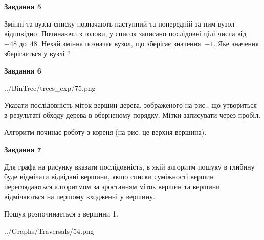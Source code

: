 \documentclass[12pt, ukrainian]{article}
\begin{document}
{\begin {large}
{\begin {center}\textbf{Завдання 5}\end {center}}\par
Змінні  та  вузла списку позначають наступний та попередній за ним вузол відповідно. Починаючи з голови, у список записано послідовні цілі числа від~$-48$ до~$48$. Нехай змінна  позначає вузол, що зберігає значення~$-1$.
Яке значення зберігається у вузлі  ?\par
\newpage

{\begin {center}\textbf{Завдання 6}\end {center}}\par

\begin{center}
	{../BinTree/trees_exp/75.png}
\end{center}
Указати послідовність міток вершин дерева, зображеного на рис., що утвориться в результаті обходу дерева в оберненому порядку. Мітки записувати через пробіл.\par Алгоритм починає роботу з кореня (на рис. це верхня вершина).\par
\newpage

{\begin {center}\textbf{Завдання 7}\end {center}}\par
Для графа на рисунку вказати послідовність, в якій алгоритм пошуку в глибину буде відмічати відвідані вершини, якщо списки суміжності вершин переглядаються алгоритмом за зростанням міток вершин та вершини відмічаються на першому вход\-женні у вершину.\par
Пошук розпочинається з вершини 1.\par

\begin{center}
	{../Graphs/Traversals/54.png}
\end{center}\par
\newpage


\end{large}}
\end{document}
